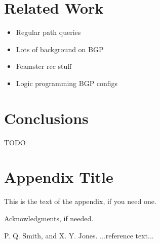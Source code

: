 \documentclass{paper}
\begin{document}
\section{Related Work}

\begin{itemize}
	\item Regular path queries
	\item Lots of background on BGP
	\item Feamster rcc stuff
	\item Logic programming BGP configs
\end{itemize}

\section{Conclusions}

TODO

\appendix
\section{Appendix Title}

This is the text of the appendix, if you need one.

\acks

Acknowledgments, if needed.





\begin{thebibliography}{}
\softraggedright

P. Q. Smith, and X. Y. Jones. ...reference text...

\end{thebibliography}
\end{document}
